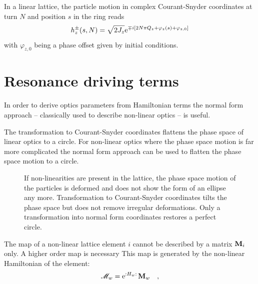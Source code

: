 In a linear lattice, the particle motion in complex Courant-Snyder coordinates at turn $N$ and position
$s$ in the ring reads
%
\begin{equation}
    h_z^\pm(s,N) = \sqrt{2J_z} \text{e}^{\mp i \left[2N\pi Q_z + \varphi_z(s) + \varphi_{z,0}\right]}
\end{equation}
%
with $\varphi_{z,0}$ being a phase offset given by initial conditions.

\section{Resonance driving terms}

In order to derive optics parameters from Hamiltonian terms the normal form approach
\cite{Bartolini1997,Tomas2005} -- classically
used to describe non-linear optics -- is useful. 

The transformation to Courant-Snyder coordinates flattens the phase space of linear optics to a circle.
For non-linear optics where the phase space motion is far more complicated the normal form approach
can be used to flatten the phase space motion to a circle.

\begin{figure}[h]
    \centering
    
    \hspace{1em}
    
    \hspace{1em}
    
    \caption{
      If non-linearities are present in the lattice, the phase space motion of the particles is
      deformed and does not show the form of an ellipse any more. 
      Transformation to Courant-Snyder
      coordinates tilts the phase space but does not remove irregular deformations.
      Only a transformation into normal form coordinates restores a perfect circle.
    }
    \label{fig_phase_space_ellipse_nl}
\end{figure}

The map of a non-linear lattice element $i$ cannot be described by a matrix $\mathbf{M}_i$ only.
A higher order map is necessary
This map is generated by the non-linear Hamiltonian of the element:
%
\begin{equation}
    \mathscr{M}_w = \text{e}^{{:}H_w{:}\,} \mathbf{M}_w
    \quad ,
\end{equation}
%
 
